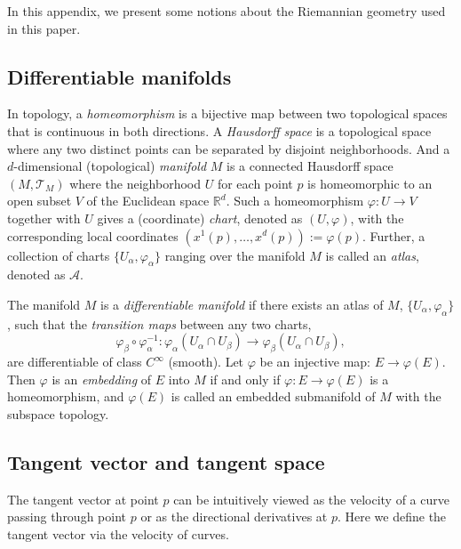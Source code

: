 \documentclass[11pt,a4paper,]{article}
\begin{document}
In this appendix, we present some notions about the Riemannian geometry used in this paper.

\hypertarget{differentiable-manifolds}{%
\subsection{Differentiable manifolds}\label{differentiable-manifolds}}

In topology, a \emph{homeomorphism} is a bijective map between two topological spaces that is continuous in both directions. A \emph{Hausdorff space} is a topological space where any two distinct points can be separated by disjoint neighborhoods. And a \(d\)-dimensional (topological) \emph{manifold} \(M\) is a connected Hausdorff space \((M, \mathcal{T}_M)\) where the neighborhood \(U\) for each point \(p\) is homeomorphic to an open subset \(V\) of the Euclidean space \(\mathbb{R}^d\). Such a homeomorphism \(\varphi: U \rightarrow V\) together with \(U\) gives a (coordinate) \emph{chart}, denoted as \((U, \varphi)\), with the corresponding local coordinates \((x^1(p),\dots, x^d(p)) := \varphi(p)\). Further, a collection of charts \(\{U_\alpha, \varphi_\alpha\}\) ranging over the manifold \(M\) is called an \emph{atlas}, denoted as \(\mathcal{A}\).

The manifold \(M\) is a \emph{differentiable manifold} if there exists an atlas of \(M\), \(\{U_\alpha, \varphi_\alpha\}\), such that the \emph{transition maps} between any two charts,
\[
\varphi_\beta \circ \varphi_\alpha^{-1}: \varphi_\alpha(U_\alpha \cap U_\beta) \rightarrow \varphi_\beta(U_\alpha \cap U_\beta),
\] are differentiable of class \(C^\infty\) (smooth).
Let \(\varphi\) be an injective map: \(E \rightarrow \varphi(E)\). Then \(\varphi\) is an \emph{embedding} of \(E\) into \(M\) if and only if
\(\varphi: E \rightarrow \varphi(E)\) is a homeomorphism, and \(\varphi(E)\) is called an embedded submanifold of \(M\) with the subspace topology.

\hypertarget{tangent-vector-and-tangent-space}{%
\subsection{Tangent vector and tangent space}\label{tangent-vector-and-tangent-space}}

The tangent vector at point \(p\) can be intuitively viewed as the velocity of a curve passing through point \(p\) or as the directional derivatives at \(p\). Here we define the tangent vector via the velocity of curves.
\end{document}
